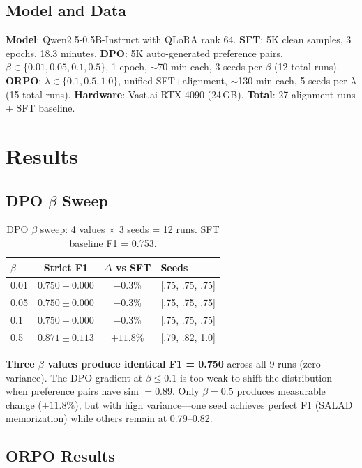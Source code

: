 \documentclass[journal]{IEEEtran}
\begin{document}
\subsection{Model and Data}
\textbf{Model}: Qwen2.5-0.5B-Instruct with QLoRA rank 64. \textbf{SFT}: 5K clean samples, 3 epochs, 18.3 minutes. \textbf{DPO}: 5K auto-generated preference pairs, $\beta \in \{0.01, 0.05, 0.1, 0.5\}$, 1 epoch, $\sim$70 min each, 3 seeds per $\beta$ (12 total runs). \textbf{ORPO}: $\lambda \in \{0.1, 0.5, 1.0\}$, unified SFT+alignment, $\sim$130 min each, 5 seeds per $\lambda$ (15 total runs). \textbf{Hardware}: Vast.ai RTX 4090 (24\,GB). \textbf{Total}: 27 alignment runs + SFT baseline.

\section{Results}

\subsection{DPO $\beta$ Sweep}

\begin{table}[!ht]
\centering\caption{DPO $\beta$ sweep: 4 values $\times$ 3 seeds = 12 runs. SFT baseline F1 = 0.753.}
\label{tab:results}
\begin{tabular}{lccl}
\toprule
\textbf{$\beta$} & \textbf{Strict F1} & \textbf{$\Delta$ vs SFT} & \textbf{Seeds} \\
\midrule
0.01 & $0.750 \pm 0.000$ & $-0.3$\% & [.75, .75, .75] \\
0.05 & $0.750 \pm 0.000$ & $-0.3$\% & [.75, .75, .75] \\
0.1  & $0.750 \pm 0.000$ & $-0.3$\% & [.75, .75, .75] \\
0.5  & $\mathbf{0.871 \pm 0.113}$ & $+11.8$\% & [.79, .82, 1.0] \\
\bottomrule
\end{tabular}
\end{table}

\textbf{Three $\beta$ values produce identical F1 = 0.750} across all 9 runs (zero variance). The DPO gradient at $\beta \leq 0.1$ is too weak to shift the distribution when preference pairs have sim $= 0.89$. Only $\beta = 0.5$ produces measurable change ($+11.8\%$), but with high variance---one seed achieves perfect F1 (SALAD memorization) while others remain at 0.79--0.82.

\subsection{ORPO Results}
\end{document}

